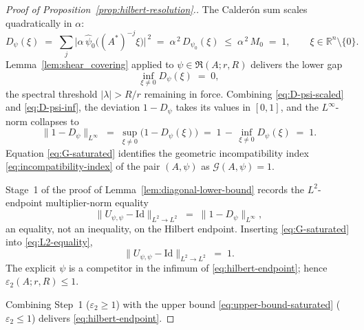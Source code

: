 \documentclass[pdflatex,sn-basic,Numbered]{sn-jnl}
\theoremstyle{thmstyleone}%
\theoremstyle{thmstylethree}%
\begin{document}
\begin{proof}[Proof of Proposition~\ref{prop:hilbert-resolution}.]
	The Calder\'on sum scales quadratically in $\alpha$:
	\begin{equation}\label{eq:D-psi-scaled}
		D_\psi(\xi)
		\;=\; \sum_{j} \bigl| \alpha \, \widehat{\psi}_0\bigl( (A^{*})^{-j}\xi \bigr) \bigr|^{\,2}
		\;=\; \alpha^{\,2}\, D_{\psi_0}(\xi)
		\;\le\; \alpha^{\,2}\, M_0
		\;=\; 1,
		\qquad \xi \in \mathbb{R}^n \setminus \{0\} .
	\end{equation}
	Lemma~\ref{lem:shear_covering} applied to
	$\psi \in \mathfrak{R}(A; r, R)$ delivers the lower gap
	\begin{equation}\label{eq:D-psi-inf}
		\inf_{\xi \neq 0} D_\psi(\xi) \;=\; 0 ,
	\end{equation}
	the spectral threshold $|\lambda| > R/r$ remaining in force.
	Combining \eqref{eq:D-psi-scaled} and \eqref{eq:D-psi-inf}, the
	deviation $1 - D_\psi$ takes its values in $[0, 1]$, and the
	$L^\infty$-norm collapses to
	\begin{equation}\label{eq:G-saturated}
		\bigl\| 1 - D_\psi \bigr\|_{L^\infty}
		\;=\; \sup_{\xi \neq 0} \bigl( 1 - D_\psi(\xi) \bigr)
		\;=\; 1 \,-\, \inf_{\xi \neq 0} D_\psi(\xi)
		\;=\; 1 .
	\end{equation}
	Equation \eqref{eq:G-saturated} identifies the geometric
	incompatibility index \eqref{eq:incompatibility-index} of the pair
	$(A, \psi)$ as $\mathcal{G}(A, \psi) = 1$.
	
	Stage~1 of the proof of Lemma~\ref{lem:diagonal-lower-bound} records
	the $L^2$-endpoint multiplier-norm equality
	\begin{equation}\label{eq:L2-equality}
		\bigl\| U_{\psi, \psi} - \mathrm{Id} \bigr\|_{L^2 \to L^2}
		\;=\; \bigl\| 1 - D_\psi \bigr\|_{L^\infty} ,
	\end{equation}
	an equality, not an inequality, on the Hilbert endpoint. Inserting
	\eqref{eq:G-saturated} into \eqref{eq:L2-equality},
	\begin{equation}\label{eq:upper-bound-saturated}
		\bigl\| U_{\psi, \psi} - \mathrm{Id} \bigr\|_{L^2 \to L^2}
		\;=\; 1 .
	\end{equation}
	The explicit $\psi$ is a competitor in the infimum of
	\eqref{eq:hilbert-endpoint}; hence
	$\varepsilon_2(A; r, R) \le 1$.
	
	\medskip
	Combining Step~1 ($\varepsilon_2 \ge 1$) with the upper bound
	\eqref{eq:upper-bound-saturated} ($\varepsilon_2 \le 1$) delivers
	\eqref{eq:hilbert-endpoint}.
\end{proof}
\end{document}
